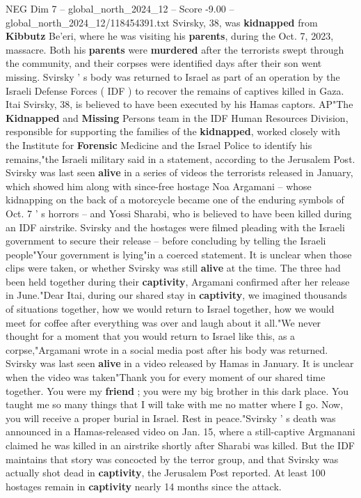 \begin{textsample}{NEG Dim 7 – global\_north\_2024\_12 – Score -9.00 – global\_north\_2024\_12/118454391.txt}  \label{ex:f7_neg_157}
Svirsky, 38, was \textbf{kidnapped} from \textbf{Kibbutz} Be'eri, where he was visiting his \textbf{parents}, during the Oct. 7, 2023, massacre.
Both his \textbf{parents} were \textbf{murdered} after the terrorists swept through the community, and their corpses were identified days after their son went missing.
Svirsky ' s body was returned to Israel as part of an operation by the Israeli Defense Forces ( IDF ) to recover the remains of captives killed in Gaza.
Itai Svirsky, 38, is believed to have been executed by his Hamas captors.
AP"The \textbf{Kidnapped} and \textbf{Missing} Persons team in the IDF Human Resources Division, responsible for supporting the families of the \textbf{kidnapped}, worked closely with the Institute for \textbf{Forensic} Medicine and the Israel Police to identify his remains,"the Israeli military said in a statement, according to the Jerusalem Post.
Svirsky was last seen \textbf{alive} in a series of videos the terrorists released in January, which showed him along with since-free hostage Noa Argamani -- whose kidnapping on the back of a motorcycle became one of the enduring symbols of Oct. 7 ' s horrors -- and Yossi Sharabi, who is believed to have been killed during an IDF airstrike.
Svirsky and the hostages were filmed pleading with the Israeli government to secure their release -- before concluding by telling the Israeli people"Your government is lying"in a coerced statement.
It is unclear when those clips were taken, or whether Svirsky was still \textbf{alive} at the time.
The three had been held together during their \textbf{captivity}, Argamani confirmed after her release in June."Dear Itai, during our shared stay in \textbf{captivity}, we imagined thousands of situations together, how we would return to Israel together, how we would meet for coffee after everything was over and laugh about it all."We never thought for a moment that you would return to Israel like this, as a corpse,"Argamani wrote in a social media post after his body was returned.
Svirsky was last seen \textbf{alive} in a video released by Hamas in January.
It is unclear when the video was taken"Thank you for every moment of our shared time together.
You were my \textbf{friend} ; you were my big brother in this dark place.
You taught me so many things that I will take with me no matter where I go.
Now, you will receive a proper burial in Israel.
Rest in peace."Svirsky ' s death was announced in a Hamas-released video on Jan. 15, where a still-captive Argmanani claimed he was killed in an airstrike shortly after Sharabi was killed.
But the IDF maintains that story was concocted by the terror group, and that Svirsky was actually shot dead in \textbf{captivity}, the Jerusalem Post reported.
At least 100 hostages remain in \textbf{captivity} nearly 14 months since the attack.

\end{textsample}
